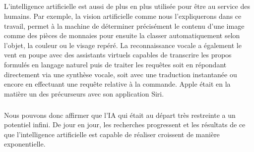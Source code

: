 \subparagraph{}
L’intelligence artificielle est aussi de plus en plus utilisée pour être au service des humains. Par exemple, la vision artificielle comme nous l’expliquerons dans ce travail, permet à la machine de déterminer précisément le contenu d'une image comme des pièces de monnaies pour ensuite la classer automatiquement selon l'objet, la couleur ou le visage repéré. 
La reconnaissance vocale a également le vent en poupe avec des assistants virtuels capables de transcrire les propos formulés en langage naturel puis de traiter les requêtes soit en répondant directement via une synthèse vocale, soit avec une traduction instantanée ou encore en effectuant une requête relative à la commande. Apple était en la matière un des précurseurs avec son application Siri.

\subparagraph{}
Nous pouvons donc affirmer que l’IA qui était au départ très restreinte a un potentiel infini. 
De jour en jour, les recherches progressent et les résultats de ce que l’intelligence artificielle est capable de réaliser croissent de manière exponentielle.




